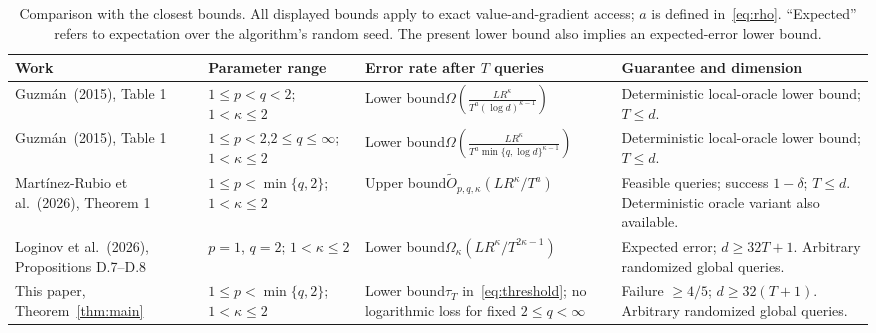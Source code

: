 \documentclass[11pt,a4paper]{article}
\theoremstyle{definition}
\theoremstyle{remark}
\begin{document}
\begin{table}[t]
\centering
\caption{Comparison with the closest bounds. All displayed bounds apply to
exact value-and-gradient access; $a$ is defined in~\eqref{eq:rho}.
``Expected'' refers to expectation over the algorithm's random seed.
The present lower bound also implies an expected-error lower bound.}
\label{tab:literature}
\small
\setlength{\tabcolsep}{4pt}
\renewcommand{\arraystretch}{1.35}
\begin{tabularx}{\textwidth}{@{}P{0.21\textwidth}P{0.18\textwidth}P{0.265\textwidth}Y@{}}
\toprule
Work & Parameter range & Error rate after $T$ queries & Guarantee and dimension\\
\midrule
Guzm\'an~\cite{Guz15}\newline (2015), Table 1
& $1\le p<q<2$; $1<\kappa\le2$
& Lower bound\newline $\displaystyle\Omega\!\left(\frac{LR^\kappa}{T^a(\log d)^{\kappa-1}}\right)$
& Deterministic local-oracle lower bound; $T\le d$.\\
Guzm\'an~\cite{Guz15}\newline (2015), Table 1
& $1\le p<2$,\newline $2\le q\le\infty$;\newline $1<\kappa\le2$
& Lower bound\newline $\displaystyle\Omega\!\left(\frac{LR^\kappa}{T^a\min\{q,\log d\}^{\kappa-1}}\right)$
& Deterministic local-oracle lower bound; $T\le d$.\\
Mart\'inez-Rubio et al.~\cite{MBGM26}\newline (2026), Theorem 1
& $1\le p<\min\{q,2\}$; $1<\kappa\le2$
& Upper bound\newline $\widetilde O_{p,q,\kappa}(LR^\kappa/T^a)$
& Feasible queries; success $1-\delta$; $T\le d$. Deterministic oracle variant also available.\\
Loginov et al.~\cite{LG26}\newline (2026), Propositions D.7--D.8
& $p=1$, $q=2$; $1<\kappa\le2$
& Lower bound\newline $\Omega_\kappa(LR^\kappa/T^{2\kappa-1})$
& Expected error; $d\ge32T+1$. Arbitrary randomized global queries.\\
This paper, Theorem~\ref{thm:main}
& $1\le p<\min\{q,2\}$; $1<\kappa\le2$
& Lower bound\newline $\tau_T$ in~\eqref{eq:threshold}; no logarithmic loss for fixed $2\le q<\infty$
& Failure $\ge4/5$; $d\ge32(T+1)$. Arbitrary randomized global queries.\\
\bottomrule
\end{tabularx}
\end{table}
\end{document}

